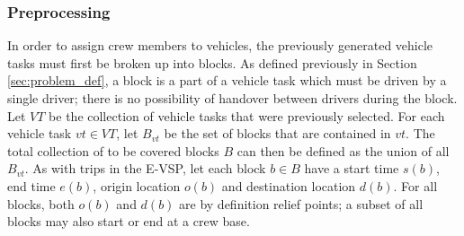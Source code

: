 \documentclass[]{article}
\begin{document}
\subsubsection{Preprocessing}
In order to assign crew members to vehicles, the previously generated vehicle tasks must first be broken up into blocks. As defined previously in Section \ref{sec:problem_def}, a block is a part of a vehicle task which must be driven by a single driver; there is no possibility of handover between drivers during the block. Let $VT$ be the collection of vehicle tasks that were previously selected. For each vehicle task $vt \in VT$, let $B_{vt}$ be the set of blocks that are contained in $vt$. The total collection of to be covered blocks $B$ can then be defined as the union of all $B_{vt}$. As with trips in the E-VSP, let each block $b \in B$ have a start time $s(b)$, end time $e(b)$, origin location $o(b)$ and destination location $d(b)$. For all blocks, both $o(b)$ and $d(b)$ are by definition relief points; a subset of all blocks may also start or end at a crew base.
\end{document}
